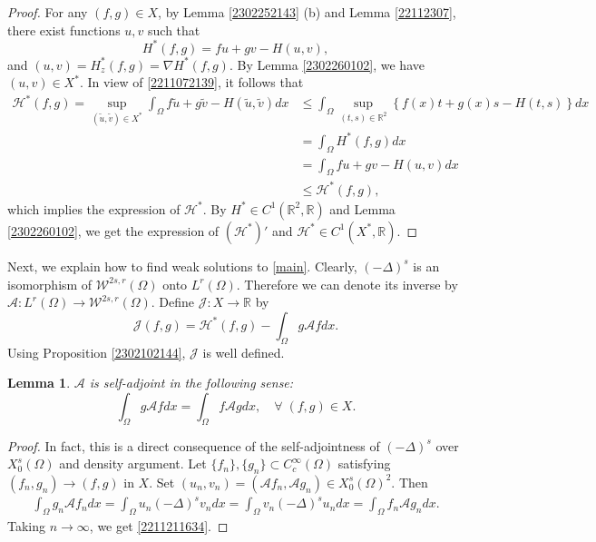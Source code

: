 \documentclass[10pt]{article}
\numberwithin{equation}{section}
\newtheorem{lemma}[theorem]{Lemma}
\numberwithin{equation}{section}
\begin{document}
\begin{proof}
For any $(f, g)\in X$, by Lemma \ref{2302252143} (b) and Lemma \ref{22112307}, there exist functions $u, v$ such that
\[
H^*(f, g)=fu + gv -H(u, v),
\]
and $(u, v) = H_z^*(f, g) = \nabla H^*(f, g)$. By Lemma \ref{2302260102}, we have $(u, v)\in X^*$. In view of \eqref{2211072139}, it follows that
\[
\begin{aligned}
\mathcal{H}^*(f, g) = \underset{(\widetilde{u}, \widetilde{v})\in X^*}{\sup} \int_{\Omega}f\widetilde{u}+g\widetilde{v}-H(\widetilde{u}, \widetilde{v}) dx & \le \int_{\Omega}\underset{(t, s)\in \mathbb{R}^2}{\sup} \left\{f(x)t+g(x)s-H(t, s) \right\} dx\\
& = \int_{\Omega}H^*(f, g) dx\\
& = \int_{\Omega} fu+gv-H(u,v) dx\\
& \le \mathcal{H}^*(f, g),
\end{aligned}
\]
which implies the expression of $\mathcal{H}^*$. By $H^*\in C^1(\mathbb{R}^2, \mathbb{R})$ and Lemma \ref{2302260102}, we get the expression of $(\mathcal{H}^{*})'$ and $\mathcal{H}^{*}\in C^1(X^*, \mathbb{R})$.
\end{proof}
Next, we explain how to find weak solutions to \eqref{main}. Clearly, $(-\Delta)^s$ is an isomorphism of $\mathcal{W}^{2s, r}(\Omega)$ onto $L^r(\Omega)$. Therefore we can denote its inverse by $\mathcal{A}: L^r(\Omega)\to \mathcal{W}^{2s, r}(\Omega)$. Define $\mathcal{J}: X\to \mathbb{R}$ by
\begin{equation}\label{2211011351}
\mathcal{J}(f, g)=\mathcal{H}^*(f, g)-\int_{\Omega}g\mathcal{A}f dx.
\end{equation}
Using Proposition \ref{2302102144}, $\mathcal{J}$ is well defined. 
\begin{lemma}\label{2211211644}
$\mathcal{A}$ is self-adjoint in the following sense: 
\begin{equation}\label{2211211634}
\int_{\Omega}g\mathcal{A}f dx=\int_{\Omega}f\mathcal{A}g dx, \quad \forall\; (f, g)\in X.
\end{equation}
\end{lemma}
\begin{proof}
In fact, this is a direct consequence of the self-adjointness of $(-\Delta)^s$ over $X_0^s(\Omega)$ and density argument. Let $\{f_n\}, \{g_n\}\subset C_c^\infty (\Omega)$ satisfying $(f_n, g_n)\to (f, g)$ in $X$. Set $(u_n, v_n) = (\mathcal{A}f_n, \mathcal{A}g_n)\in X_0^{s}(\Omega)^2$. Then
\[
\begin{split}
\int_{\Omega}g_n\mathcal{A}f_n dx=\int_{\Omega} u_n (-\Delta)^sv_n dx=\int_{\Omega}v_n (-\Delta)^s u_n dx=\int_{\Omega}f_n\mathcal{A}g_n dx.
\end{split}
\]
Taking $n\to \infty$, we get \eqref{2211211634}.
\end{proof}
\end{document}
